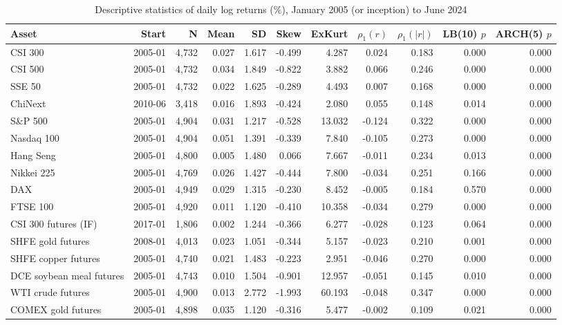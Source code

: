 \begin{table}[!htbp]\centering\scriptsize
\caption{Descriptive statistics of daily log returns (\%), January 2005 (or inception) to June 2024}\label{tab:desc}
\begin{adjustbox}{max width=\textwidth}
\begin{tabular}{lrrrrrrrrrr}
\toprule
Asset & Start & N & Mean & SD & Skew & ExKurt & $\rho_1(r)$ & $\rho_1(|r|)$ & LB(10) $p$ & ARCH(5) $p$\\
\midrule
CSI 300 & 2005-01 & 4,732 & 0.027 & 1.617 & -0.499 & 4.287 & 0.024 & 0.183 & 0.000 & 0.000\\
CSI 500 & 2005-01 & 4,732 & 0.034 & 1.849 & -0.822 & 3.882 & 0.066 & 0.246 & 0.000 & 0.000\\
SSE 50 & 2005-01 & 4,732 & 0.022 & 1.625 & -0.289 & 4.493 & 0.007 & 0.168 & 0.000 & 0.000\\
ChiNext & 2010-06 & 3,418 & 0.016 & 1.893 & -0.424 & 2.080 & 0.055 & 0.148 & 0.014 & 0.000\\
S\&P 500 & 2005-01 & 4,904 & 0.031 & 1.217 & -0.528 & 13.032 & -0.124 & 0.322 & 0.000 & 0.000\\
Nasdaq 100 & 2005-01 & 4,904 & 0.051 & 1.391 & -0.339 & 7.840 & -0.105 & 0.273 & 0.000 & 0.000\\
Hang Seng & 2005-01 & 4,800 & 0.005 & 1.480 & 0.066 & 7.667 & -0.011 & 0.234 & 0.013 & 0.000\\
Nikkei 225 & 2005-01 & 4,769 & 0.026 & 1.427 & -0.444 & 7.800 & -0.034 & 0.251 & 0.166 & 0.000\\
DAX & 2005-01 & 4,949 & 0.029 & 1.315 & -0.230 & 8.452 & -0.005 & 0.184 & 0.570 & 0.000\\
FTSE 100 & 2005-01 & 4,920 & 0.011 & 1.120 & -0.410 & 10.358 & -0.034 & 0.279 & 0.000 & 0.000\\
CSI 300 futures (IF) & 2017-01 & 1,806 & 0.002 & 1.244 & -0.366 & 6.277 & -0.028 & 0.123 & 0.064 & 0.000\\
SHFE gold futures & 2008-01 & 4,013 & 0.023 & 1.051 & -0.344 & 5.157 & -0.023 & 0.210 & 0.001 & 0.000\\
SHFE copper futures & 2005-01 & 4,740 & 0.021 & 1.483 & -0.223 & 2.951 & -0.046 & 0.270 & 0.000 & 0.000\\
DCE soybean meal futures & 2005-01 & 4,743 & 0.010 & 1.504 & -0.901 & 12.957 & -0.051 & 0.145 & 0.010 & 0.000\\
WTI crude futures & 2005-01 & 4,900 & 0.013 & 2.772 & -1.993 & 60.193 & -0.048 & 0.347 & 0.000 & 0.000\\
COMEX gold futures & 2005-01 & 4,898 & 0.035 & 1.120 & -0.316 & 5.477 & -0.002 & 0.109 & 0.021 & 0.000\\

\end{tabular}
\end{adjustbox}
\end{table}
